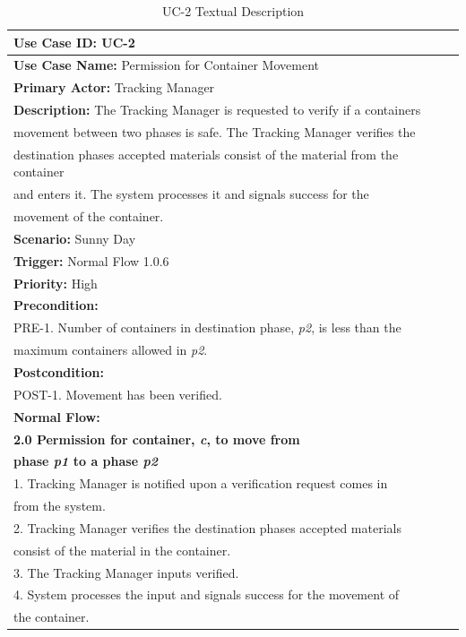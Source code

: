 \begin{table}[h]
\begin{center}
\begin{tabular}{|l|l|}
\hline
\textbf{Use Case ID:} UC-2 \\ \hline
\textbf{Use Case Name:} Permission for Container Movement \\ \hline
\textbf {Primary Actor:} Tracking Manager \\ \hline
\textbf{Description:} The Tracking Manager is requested to verify if a containers \\movement between two phases is safe. The Tracking Manager verifies the \\destination phases accepted materials consist of the material from the container \\and enters it. The system processes it and signals success for the \\movement of the container. \\ \hline
\textbf{Scenario:} Sunny Day \\ \hline
\textbf{Trigger:} Normal Flow 1.0.6\\ \hline
\textbf{Priority:} High \\ \hline
\textbf{Precondition:}
\\ PRE-1. Number of containers in destination phase, \emph{p2}, is less than the \\maximum containers allowed in \emph{p2}.\\ \hline
\textbf{Postcondition:}
\\ POST-1. Movement has been verified. \\ \hline
\textbf{Normal Flow:}
\\ \textbf{2.0 Permission for container, \emph{c}, to move from}
\\ \textbf{phase \emph{p1} to a phase \emph{p2}}
\\ 1. Tracking Manager is notified upon a verification request comes in \\from the system.
\\ 2. Tracking Manager verifies the destination phases accepted materials \\consist of the material in the container.
\\ 3. The Tracking Manager inputs verified.
\\ 4. System processes the input and signals success for the movement of \\the container. \\ \hline
\end{tabular}
\end{center}
\caption {UC-2 Textual Description}
\label{tbl:uc2td}
\end{table}

